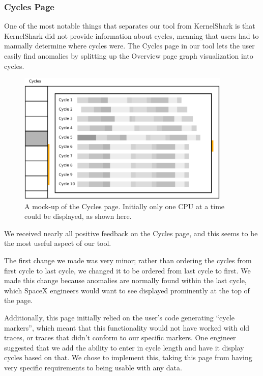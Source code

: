 \documentclass{hmcclinic}
\begin{document}
\subsubsection{Cycles Page}

One of the most notable things that separates our tool from KernelShark is that
KernelShark did not provide information about cycles, meaning that users had to
manually determine where cycles were.
The Cycles page in our tool lets the user easily find anomalies by splitting up
the Overview page graph visualization into cycles.

\begin{figure}
\begin{center}
\includegraphics[width=4in]{oldcycles.png}
\caption{A mock-up of the Cycles page. Initially only one CPU at a time could be
displayed, as shown here.}
\end{center}
\end{figure}

We received nearly all positive feedback on the Cycles page, and this seems to
be the most useful aspect of our tool.

The first change  we made was very minor; rather than ordering the cycles from first cycle to last cycle, we changed it to be ordered from last cycle to first. We made this change because anomalies are normally found within the last cycle, which SpaceX engineers would want to see displayed prominently at the top of the page.

Additionally, this page initially relied on the user's code generating ``cycle
markers'', which meant that this functionality would not have worked with old
traces, or traces that didn't conform to our specific markers. One engineer
suggested that we add the ability to enter in cycle length and have it display
cycles based on that. We chose to implement this, taking this page from having
very specific requirements to being usable with any data.
\end{document}
